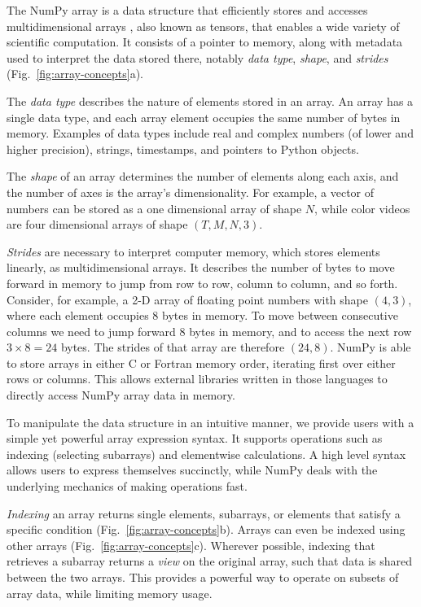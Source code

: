 The NumPy array is a data structure that efficiently stores and accesses
multidimensional arrays \cite{vanderwalt2011numpy}, also known as tensors, that
enables a wide variety of scientific computation.
It consists of a pointer to memory, along with metadata used to interpret the
data stored there, notably {\em data type}, {\em shape}, and {\em strides}
(Fig.~\ref{fig:array-concepts}a).

The \emph{data type} describes the nature of elements stored in an array.
An array has a single data type, and each array element occupies the same
number of bytes in memory.
Examples of data types include real and complex numbers (of lower and higher
precision), strings, timestamps, and pointers to Python objects.

The \emph{shape} of an array determines the number of elements along each axis,
and the number of axes is the array's dimensionality.
For example, a vector of numbers can be stored as a one dimensional array of
shape $N$, while color videos are four dimensional arrays of shape
$(T, M, N, 3)$.

\emph{Strides} are necessary to interpret computer memory, which stores elements
linearly, as multidimensional arrays.
It describes the number of bytes to move forward in memory to jump from row to
row, column to column, and so forth.
Consider, for example, a 2-D array of floating point numbers with shape
$(4, 3)$, where each element occupies 8 bytes in memory.
To move between consecutive columns we need to jump forward 8 bytes in memory,
and to access the next row $3 \times 8 = 24$ bytes.
The strides of that array are therefore $(24, 8)$.  NumPy is able to
store arrays in either C or Fortran memory order, iterating
first over either rows or columns.  This allows external libraries
written in those languages to directly access NumPy array data in memory.

To manipulate the data structure in an intuitive manner, we provide users with
a simple yet powerful array expression syntax.
It supports operations such as indexing (selecting subarrays) and elementwise
calculations.
A high level syntax allows users to express themselves succinctly, while NumPy
deals with the underlying mechanics of making operations fast.

\emph{Indexing} an array returns single elements, subarrays, or elements that satisfy
a specific condition (Fig.~\ref{fig:array-concepts}b).
Arrays can even be indexed using other arrays (Fig.~\ref{fig:array-concepts}c).
Wherever possible, indexing that retrieves a subarray returns a {\em view} on
the original array, such that data is shared between the two arrays.
This provides a powerful way to operate on subsets of array data, while
limiting memory usage.

